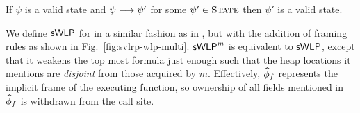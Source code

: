 \documentclass {llncs}
\begin{document}
\begin{proposition}\label{prop:svlrp-preservation-equi}
    If $\psi$ is a valid state and $\psi \longrightarrow \psi'$ for some $\psi' \in \textup{\textsc{State}}$ then $\psi'$ is a valid state.
\end{proposition}

%
%    
%
%


We define $\textup{\textmd{\textsf{sWLP}}}$ for \svlrp in a similar fashion as in \svl, but with the addition of framing rules as shown in Fig.~\ref{fig:svlrp-wlp-multi}. $\textup{\textmd{\textsf{sWLP}}}^m$ is equivalent to $\textup{\textmd{\textsf{sWLP}}}$, except that it weakens the top most formula just enough such that the heap locations it mentions are {\em disjoint} from those acquired by $m$.
Effectively, $\widehat{\phi}_f$ represents the implicit frame of the executing function, so ownership of all fields mentioned in $\widehat{\phi}_f$ is withdrawn from the call site.
\end{document}
